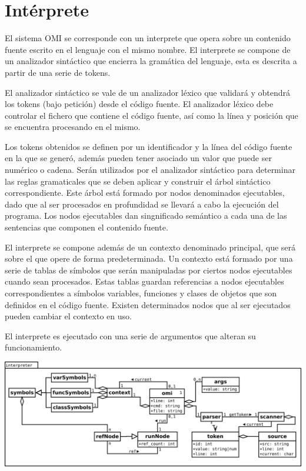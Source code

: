 \section{Intérprete}
El sistema OMI se corresponde con un interprete que opera sobre 
un contenido fuente escrito en el lenguaje con el mismo nombre. 
El interprete se compone de un analizador sintáctico que encierra la 
gramática del lenguaje, esta es descrita a partir de una serie de tokens.

El analizador sintáctico se vale de un analizador léxico que validará 
y obtendrá los tokens (bajo petición) desde el código fuente.
El analizador léxico debe controlar el fichero que contiene el código fuente, 
así como la línea y posición que se encuentra procesando en el mismo.

Los tokens obtenidos se definen por un identificador y la línea del código fuente en la que se generó,
además pueden tener asociado un valor que puede ser numérico o cadena. Serán utilizados 
por el analizador sintáctico para determinar las reglas gramaticales que se deben aplicar y
construir el árbol sintáctico correspondiente. Este árbol está formado 
por nodos denominados ejecutables, dado que al ser procesados en profundidad se llevará 
a cabo la ejecución del programa. Los nodos ejecutables dan singnificado semántico a 
cada una de las sentencias que componen el contenido fuente.

El interprete se compone además de un contexto denominado principal, que será sobre el que 
opere de forma predeterminada. Un contexto está formado por una serie de tablas de símbolos 
que serán manipuladas por ciertos nodos ejecutables cuando sean procesados. Estas tablas guardan 
referencias a nodos ejecutables correspondientes a símbolos variables, funciones y clases de objetos 
que son definidos en el código fuente. Existen determinados nodos que al ser ejecutados pueden 
cambiar el contexto en uso.

El interprete es ejecutado con una serie de argumentos que alteran su funcionamiento.

\begin{center}
\includegraphics[scale=0.3]{interpreter.png} \\
\end{center}
\pagebreak
